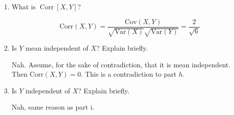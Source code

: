 \documentclass[11pt]{article}
\newcommand{\Var}{\text{Var}}
\newcommand{\Cov}{\text{Cov}}
\newcommand{\Corr}{\text{Corr}}
\begin{document}
\begin{problem}
\begin{enumerate}[label=(\alph*)]
\begin{solution}
\end{solution}
    \item What is \( \operatorname{Corr}[X, Y] \)?
    \begin{solution}
\[\Corr(X,Y) = \frac{\Cov(X,Y)}{\sqrt{\Var(X)}\sqrt{\Var(Y)}} = \frac{2}{\sqrt{6}} \]
    \end{solution}
    \item Is \( Y \) mean independent of \( X \)? Explain briefly.
\begin{solution}
Nah. Assume, for the sake of contradiction, that it is mean independent. Then $\Corr(X,Y) = 0.$ This is a contradiction to part $h$.
\end{solution}
    \item Is \( Y \) independent of \( X \)? Explain briefly.
\begin{solution}
    Nah, same reason as part i.
\end{solution}
\end{enumerate}
\end{problem}
\end{document}
